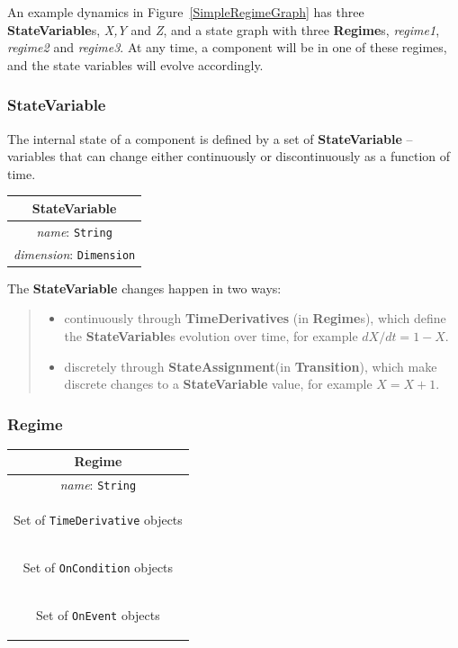\documentclass{article}
\newcommand{\StateVariable}{{\bf{StateVariable}}\xspace}
\newcommand{\StateVariables}{{\bf{StateVariable}}s\xspace}
\newcommand{\StateAssignment}{{\bf{StateAssignment}}\xspace}
\newcommand{\Regimes}{{\bf{Regime}}s\xspace}
\newcommand{\Transition}{{\bf{Transition}}\xspace}
\begin{document}
An example dynamics in Figure~\ref{SimpleRegimeGraph} has three \StateVariables,
\emph{X,Y} and \emph{Z}, and a state graph with three \Regimes, \emph{regime1},
\emph{regime2} and \emph{regime3}. At any time, a component will be in one of
these regimes, and the state variables will evolve accordingly.

\subsubsection{StateVariable}
\label{state-var}

The internal state of a component is defined by a set of \StateVariable
-- variables that can change either continuously or discontinuously as a
function of time.

\begin{table}[htb]
\center
\begin{tabular}{|c|}
\hline
\hline
StateVariable \\
\hline
\hline
{\em name}: {\tt String} \\
\hline
{\em dimension}: {\tt Dimension} \\
\hline
\end{tabular}
\end{table}

The \StateVariable changes happen in two ways:
%
\begin{quote}
\begin{itemize}
\item continuously through \textbf{TimeDerivatives} (in \Regimes),
which define the \StateVariables evolution over time, for example
$dX/dt=1-X$.
\item discretely through \StateAssignment (in \Transition),
which make discrete changes to a \StateVariable value, for example
$X = X + 1$.
\end{itemize}
\end{quote}

\subsubsection{Regime}
\label{regime}


\begin{table}[htb]
\center
\begin{tabular}{|c|}
\hline
\hline
Regime \\
\hline
\hline
{\em name}: {\tt String} \\
\hline
\colorbox{issuecolor}{\parbox{0.4\linewidth}
{\center Set of {\tt TimeDerivative} objects}} \\
\hline
\colorbox{issuecolor}{\parbox{0.4\linewidth}
{\center Set of {\tt OnCondition} objects}} \\
\hline
\colorbox{issuecolor}{\parbox{0.4\linewidth}
{\center Set of {\tt OnEvent} objects}} \\
\hline
\end{tabular}
\end{table}
\end{document}
